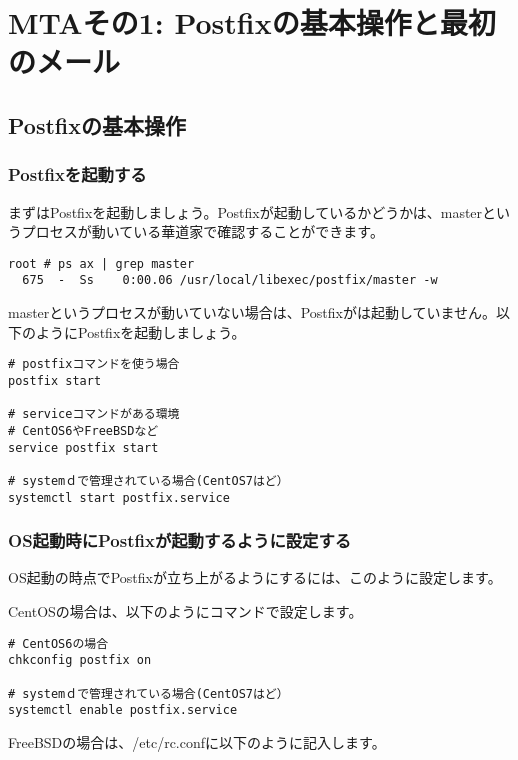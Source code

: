 \chapter{MTAその1: Postfixの基本操作と最初のメール}

\section{Postfixの基本操作}

\subsection{Postfixを起動する}
まずはPostfixを起動しましょう。Postfixが起動しているかどうかは、masterというプロセスが動いている華道家で確認することができます。

\begin{lstlisting}[basicstyle=\ttfamily\footnotesize, frame=single]
root # ps ax | grep master
  675  -  Ss    0:00.06 /usr/local/libexec/postfix/master -w
\end{lstlisting}

masterというプロセスが動いていない場合は、Postfixがは起動していません。以下のようにPostfixを起動しましょう。

\begin{lstlisting}[basicstyle=\ttfamily\footnotesize, frame=single]
# postfixコマンドを使う場合
postfix start

# serviceコマンドがある環境
# CentOS6やFreeBSDなど
service postfix start

# systemｄで管理されている場合(CentOS7はど）
systemctl start postfix.service
\end{lstlisting}

\subsection{OS起動時にPostfixが起動するように設定する}

OS起動の時点でPostfixが立ち上がるようにするには、このように設定します。

CentOSの場合は、以下のようにコマンドで設定します。

\begin{lstlisting}[basicstyle=\ttfamily\footnotesize, frame=single]
# CentOS6の場合
chkconfig postfix on

# systemｄで管理されている場合(CentOS7はど）
systemctl enable postfix.service
\end{lstlisting}

FreeBSDの場合は、/etc/rc.confに以下のように記入します。

